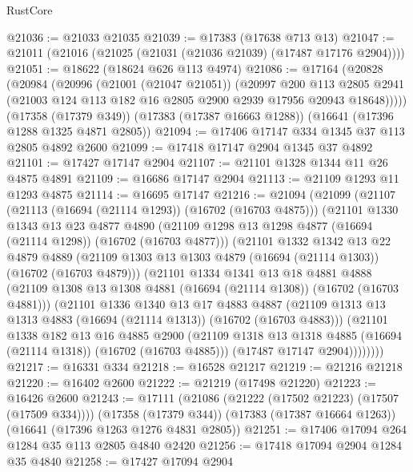 \begin{lexlean}{RustCore}
\begin{coremodule}
@21036 := @21033 @21035
@21039 := @17383 (@17638 @713 @13)
@21047 := @21011 (@21016 (@21025 (@21031 (@21036 @21039) (@17487 @17176 @2904))))
@21051 := @18622 (@18624 @626 @113 @4974)
@21086 := @17164
    (@20828
      (@20984
        (@20996
          (@21001 (@21047 @21051))
          (@20997
            @200
            @113
            @2805
            @2941
            (@21003 @124 @113 @182 @16 @2805 @2900 @2939 @17956 @20943 @18648)))))
    (@17358 (@17379 @349))
    (@17383 (@17387 @16663 @1288))
    (@16641 (@17396 @1288 @1325 @4871 @2805))
@21094 := @17406 @17147 @334 @1345 @37 @113 @2805 @4892 @2600
@21099 := @17418 @17147 @2904 @1345 @37 @4892
@21101 := @17427 @17147 @2904
@21107 := @21101 @1328 @1344 @11 @26 @4875 @4891
@21109 := @16686 @17147 @2904
@21113 := @21109 @1293 @11 @1293 @4875
@21114 := @16695 @17147
@21216 := @21094
    (@21099
      (@21107
        (@21113 (@16694 (@21114 @1293)) (@16702 (@16703 @4875)))
        (@21101
          @1330
          @1343
          @13
          @23
          @4877
          @4890
          (@21109 @1298 @13 @1298 @4877 (@16694 (@21114 @1298)) (@16702 (@16703 @4877)))
          (@21101
            @1332
            @1342
            @13
            @22
            @4879
            @4889
            (@21109 @1303 @13 @1303 @4879 (@16694 (@21114 @1303)) (@16702 (@16703 @4879)))
            (@21101
              @1334
              @1341
              @13
              @18
              @4881
              @4888
              (@21109 @1308 @13 @1308 @4881 (@16694 (@21114 @1308)) (@16702 (@16703 @4881)))
              (@21101
                @1336
                @1340
                @13
                @17
                @4883
                @4887
                (@21109 @1313 @13 @1313 @4883 (@16694 (@21114 @1313)) (@16702 (@16703 @4883)))
                (@21101
                  @1338
                  @182
                  @13
                  @16
                  @4885
                  @2900
                  (@21109 @1318 @13 @1318 @4885 (@16694 (@21114 @1318)) (@16702 (@16703 @4885)))
                  (@17487 @17147 @2904))))))))
@21217 := @16331 @334
@21218 := @16528 @21217
@21219 := @21216 @21218
@21220 := @16402 @2600
@21222 := @21219 (@17498 @21220)
@21223 := @16426 @2600
@21243 := @17111
    (@21086 (@21222 (@17502 @21223) (@17507 (@17509 @334))))
    (@17358 (@17379 @344))
    (@17383 (@17387 @16664 @1263))
    (@16641 (@17396 @1263 @1276 @4831 @2805))
@21251 := @17406 @17094 @264 @1284 @35 @113 @2805 @4840 @2420
@21256 := @17418 @17094 @2904 @1284 @35 @4840
@21258 := @17427 @17094 @2904

\end{coremodule}
\end{lexlean}
